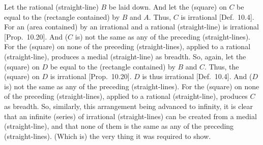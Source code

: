 \begin{Parallel}{}{}
{Let the rational (straight-line) $B$ be laid down. And let the (square) on $C$
be equal to the (rectangle contained) by $B$ and $A$. Thus, $C$ is
irrational [Def.~10.4]. For an (area contained) by
an irrational and a rational (straight-line) is irrational [Prop.~10.20]. And ($C$ is) not the same as
any of the preceding (straight-lines). For the (square) on none of
the preceding (straight-lines), applied to a rational (straight-line),
produces a medial (straight-line) as breadth. So, again, let the (square)
on $D$ be equal to the (rectangle contained) by $B$ and $C$. Thus,
the (square) on $D$ is irrational [Prop.~10.20]. 
$D$ is thus irrational [Def.~10.4]. And ($D$ is)
not the same as any of the preceding (straight-lines). For the (square) on
none of the preceding (straight-lines), applied to a rational (straight-line),
produces $C$ as breadth. So, similarly, this arrangement being
advanced to infinity, it is clear that an infinite (series) of irrational (straight-lines) can be created from a medial
(straight-line), and that none of them is the same as any of the preceding
(straight-lines). (Which is) the very thing it was required to show.}
\end{Parallel}

